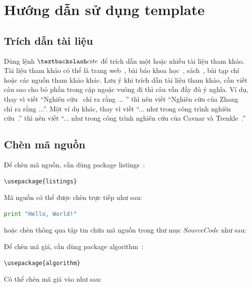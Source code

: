 \chapter{Hướng dẫn sử dụng template}
\label{Chapter3}

\section{Trích dẫn tài liệu}

Dùng lệnh $\textbackslash cite$ để trích dẫn một hoặc nhiều tài liệu tham khảo.
Tài liệu tham khảo có thể là trang web~\cite{Listings,HDLVThS}, bài báo khoa học~\cite{1994-Cavnar}, sách~\cite{1984-TeX-Knuth,2006-DDien,2006-NPTV}, bài tạp chí~\cite{1989-TED} hoặc các nguồn tham khảo khác. 
Lưu ý khi trích dẫn tài liệu tham khảo, cần viết câu sao cho bỏ phần trong cặp ngoặc vuông đi thì câu vẫn đầy đủ ý nghĩa.
Ví dụ, thay vì viết ``Nghiên cứu~\cite{1989-TED} chỉ ra rằng ... '' thì nên viết ``Nghiên cứu của Zhang~\cite{1989-TED} chỉ ra rằng ...''.
Một ví dụ khác, thay vì viết ``... như trong công trình nghiên cứu~\cite{1994-Cavnar}.'' thì nên viết ``... như trong công trình nghiên cứu của Cavnar và Trenkle~\cite{1994-Cavnar}.''

\section{Chèn mã nguồn}

Để chèn mã nguồn, cần dùng package listings~\cite{Listings}:

\begin{lstlisting}
\usepackage{listings}
\end{lstlisting}

Mã nguồn có thể được chèn trực tiếp như sau:

\begin{lstlisting}[language=Python]
print "Hello, World!"
\end{lstlisting}

hoặc chèn thông qua tập tin chứa mã nguồn trong thư mục $SourceCode$ như sau:



Để chèn mã giả, cần dùng package algorithm~\cite{Algorithm}:

\begin{lstlisting}
\usepackage{algorithm}
\end{lstlisting}

Có thể chèn mã giả vào như sau:

